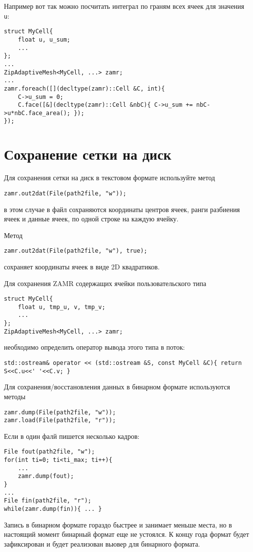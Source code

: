 \documentclass[12pt]{article}
\begin{document}
Например вот так можно посчитать интеграл по граням всех ячеек для значения \verb'u':
\begin{verbatim}
struct MyCell{ 
    float u, u_sum; 
    ...
};
...
ZipAdaptiveMesh<MyCell, ...> zamr;
...
zamr.foreach([](decltype(zamr)::Cell &C, int){
    C->u_sum = 0;
    C.face([&](decltype(zamr)::Cell &nbC){ С->u_sum += nbC->u*nbC.face_area(); });
});
\end{verbatim}

\section{Сохранение сетки на диск}
Для сохранения сетки на диск в текстовом формате используйте метод
\begin{verbatim}
zamr.out2dat(File(path2file, "w"));
\end{verbatim}
в этом случае в файл сохраняются координаты центров ячеек, ранги разбиения ячеек и данные ячеек, по одной строке на каждую ячейку.

Метод
\begin{verbatim}
zamr.out2dat(File(path2file, "w"), true);
\end{verbatim}
сохраняет координаты ячеек в виде 2D квадратиков. 

Для сохранения ZAMR содержащих ячейки пользовательского типа
\begin{verbatim}
struct MyCell{ 
    float u, tmp_u, v, tmp_v; 
    ...
};
ZipAdaptiveMesh<MyCell, ...> zamr;
\end{verbatim}
необходимо определить оператор вывода этого типа в поток:
\begin{verbatim}
std::ostream& operator << (std::ostream &S, const MyCell &C){ return S<<C.u<<' '<<C.v; }
\end{verbatim}

Для сохранения/восстановления данных в бинарном формате используются методы
\begin{verbatim}
zamr.dump(File(path2file, "w"));
zamr.load(File(path2file, "r"));
\end{verbatim}
Если в один фалй пишется несколько кадров:
\begin{verbatim}
File fout(path2file, "w");
for(int ti=0; ti<ti_max; ti++){
    ...
    zamr.dump(fout);
}
...
File fin(path2file, "r");
while(zamr.dump(fin)){ ... }
\end{verbatim}
Запись в бинарном формате гораздо быстрее и занимает меньше места, но в настоящий момент бинарный формат еще не устоялся. 
К концу года формат будет зафиксирован и  будет реализован вьювер для бинарного формата.
\end{document}
